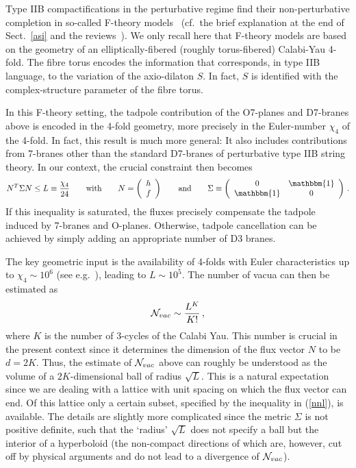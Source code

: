 \documentclass[12pt]{article}
\newcommand{\be}{\begin{equation}}
\newcommand{\ee}{\end{equation}}
\numberwithin{equation}{section}
\begin{document}
Type IIB compactifications in the perturbative regime find their non-perturbative completion in so-called F-theory models~\cite{Vafa:1996xn} (cf.~the brief explanation at the end of Sect.~\ref{asi} and the reviews~\cite{Denef:2008wq, Heckman:2010bq, Weigand:2010wm}). We only recall here that F-theory models are based on the geometry of an elliptically-fibered (roughly torus-fibered) Calabi-Yau 4-fold. The fibre torus encodes the information that corresponds, in type IIB language, to the variation of the axio-dilaton $S$. In fact, $S$ is identified with the complex-structure parameter of the fibre torus.

In this F-theory setting, the tadpole contribution of the O7-planes and D7-branes above is encoded in the 4-fold geometry, more precisely in the Euler-number $\chi_4$ of the 4-fold. In fact, this result is much more general: It also includes contributions from 7-branes other than the standard D7-branes of perturbative type IIB string theory. In our context, the crucial constraint then becomes 
\be
N^T\Sigma N\leq L\equiv\frac{\chi_4}{24}\qquad \mbox{with}\qquad N=\left(
\begin{array}{c} h\\f \end{array}\right)\qquad \mbox{and}\qquad 
\Sigma\equiv\left(\begin{array}{cc}0 & \mathbbm{1} \\ \mathbbm{1} & 0\end{array}\right)\,.\label{nnl}
\ee
If this inequality is saturated, the fluxes precisely compensate the tadpole induced by 7-branes and O-planes. Otherwise, tadpole cancellation can be achieved by simply adding an appropriate number of D3 branes.


The key geometric input is the availability of 4-folds with Euler characteristics up to $\chi_4\sim 10^6$ (see e.g.~\cite{Klemm:1996ts}), leading to $L\sim 10^5$. The number of vacua can then be estimated as~\cite{Denef:2004ze}
\be
{\cal N}_{vac}\sim\frac{L^K}{K!}\,,
\ee
where $K$ is the number of 3-cycles of the Calabi Yau. This number is crucial in the present context since it determines the dimension of the flux vector $N$ to be $d=2K$. Thus, the estimate of ${\cal N}_{vac}$ above can roughly be understood as the volume of a $2K$-dimensional ball of radius $\sqrt{L}$. This is a natural expectation since we are dealing with a lattice with unit spacing on which the flux vector can end. Of this lattice only a certain subset, specified by the inequality in (\ref{nnl}), is available. The details are slightly more complicated since the metric $\Sigma$ is not positive definite, such that the `radius' $\sqrt{L}$ does not specify a ball but the interior of a hyperboloid (the non-compact directions of which are, however, cut off by physical arguments and do not lead to a divergence of ${\cal N}_{vac}$). 
\end{document}
